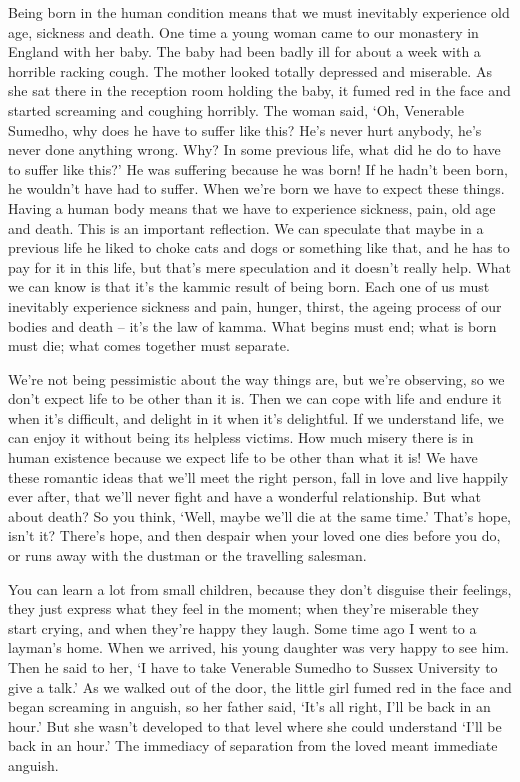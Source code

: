 Being born in the human condition means that we must inevitably experience old age, sickness and death. One time a young woman came to our monastery in England with her baby. The baby had been badly ill for about a week with a horrible racking cough. The mother looked totally depressed and miserable. As she sat there in the reception room holding the baby, it fumed red in the face and started screaming and coughing horribly. The woman said, `Oh, Venerable Sumedho, why does he have to suffer like this? He's never hurt anybody, he's never done anything wrong. Why? In some previous life, what did he do to have to suffer like this?' He was suffering because he was born! If he hadn't been born, he wouldn't have had to suffer. When we're born we have to expect these things. Having a human body means that we have to experience sickness, pain, old age and death. This is an important reflection. We can speculate that maybe in a previous life he liked to choke cats and dogs or something like that, and he has to pay for it in this life, but that's mere speculation and it doesn't really help. What we can know is that it's the kammic result of being born. Each one of us must inevitably experience sickness and pain, hunger, thirst, the ageing process of our bodies and death -- it's the law of kamma. What begins must end; what is born must die; what comes together must separate.

We're not being pessimistic about the way things are, but we're observing, so we don't expect life to be other than it is. Then we can cope with life and endure it when it's difficult, and delight in it when it's delightful. If we understand life, we can enjoy it without being its helpless victims. How much misery there is in human existence because we expect life to be other than what it is! We have these romantic ideas that we'll meet the right person, fall in love and live happily ever after, that we'll never fight and have a wonderful relationship. But what about death? So you think, `Well, maybe we'll die at the same time.' That's hope, isn't it? There's hope, and then despair when your loved one dies before you do, or runs away with the dustman or the travelling salesman.

You can learn a lot from small children, because they don't disguise their feelings, they just express what they feel in the moment; when they're miserable they start crying, and when they're happy they laugh. Some time ago I went to a layman's home. When we arrived, his young daughter was very happy to see him. Then he said to her, `I have to take Venerable Sumedho to Sussex University to give a talk.' As we walked out of the door, the little girl fumed red in the face and began screaming in anguish, so her father said, `It's all right, I'll be back in an hour.' But she wasn't developed to that level where she could understand `I'll be back in an hour.' The immediacy of separation from the loved meant immediate anguish.

